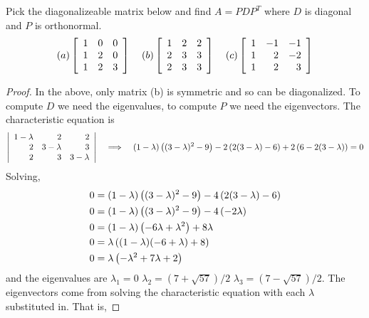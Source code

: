 \documentclass{tutorial}
\begin{document}
\begin{prob}
Pick the diagonalizeable matrix below and find $A = P D P^T$ where $D$ is diagonal and $P$ is orthonormal.
\[
  (a) \left[ \begin{array}{rrr}
    1 & 0 & 0 \\
    1 & 2 & 0 \\
    1 & 2 & 3
  \end{array} \right]
  \hspace{0.15in}
  (b) \left[ \begin{array}{rrr}
    1 & 2 & 2 \\
    2 & 3 & 3 \\
    2 & 3 & 3
  \end{array} \right]
  \hspace{0.15in}
  (c) \left[ \begin{array}{rrr}
    1 &-1 &-1 \\
    1 & 2 &-2 \\
    1 & 2 & 3    
  \end{array} \right]
\]
\end{prob} \ifsolns \begin{proof}
In the above, only matrix (b) is symmetric and so can be diagonalized. To compute $D$ we need the eigenvalues, to compute $P$ we need the eigenvectors. The characteristic equation is
\[
  \left| \begin{array}{rrr}
    1-\lambda & 2 & 2 \\
    2 & 3-\lambda & 3 \\
    2 & 3 & 3-\lambda
  \end{array} \right|
  \hspace{0.15in} \Longrightarrow \hspace{0.15in}
  (1-\lambda) \left( (3-\lambda)^2 - 9 \right) - 2 \left( 2(3-\lambda) - 6 \right) + 2 \left( 6 - 2 (3-\lambda) \right) = 0
\]
Solving,
\begin{align*}
  0 &= (1-\lambda) \left( (3-\lambda)^2 - 9 \right) - 4 \left( 2(3-\lambda) - 6 \right) \\
  0 &= (1-\lambda) \left( (3-\lambda)^2 - 9 \right) - 4 \left( -2\lambda \right) \\
  0 &= (1-\lambda) \left( - 6\lambda + \lambda^2 \right) +8 \lambda \\
  0 &= \lambda \left( (1-\lambda)(-6+\lambda) + 8 \right) \\
  0 &= \lambda \left( -\lambda^2 + 7 \lambda +2\right)
\end{align*}
and the eigenvalues are $\lambda_1 = 0$ $\lambda_2 = (7+\sqrt{57})/2$ $\lambda_3 = (7-\sqrt{57})/2$. The eigenvectors come from solving the characteristic equation with each $\lambda$ substituted in. That is,

\end{proof}
\end{document}
